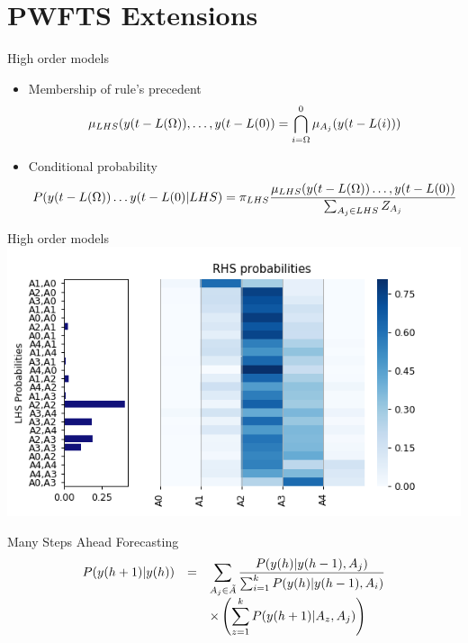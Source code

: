 \documentclass{beamer}
\begin{document}
\section{PWFTS Extensions}


\begin{frame}{High order models}
\begin{itemize}
    \item Membership of rule's precedent
$$
\displaystyle  \mu_{LHS}(y(t-L(\Omega)),\ldots,y(t-L(0)) = \bigcap_{i = \Omega}^0 \mu_{A_j}(y(t-L(i)))
$$
    \item Conditional probability
$$
P(y(t-L(\Omega))\ldots y(t-L(0) | LHS) = \pi_{LHS} \frac{\mu_{LHS}(y(t-L(\Omega))\ldots,y(t-L(0))}{\sum_{A_j \in LHS} Z_{A_j}}
$$
\end{itemize}
\end{frame}


\begin{frame}{High order models}
\includegraphics[width=\textwidth]{figures/pwfts_densities_secondorder.png}
\end{frame}


\begin{frame}{Many Steps Ahead Forecasting}
$$
\begin{array}{rcl}
P(y(h+1) | y(h))     & = &  \displaystyle \sum_{A_j \in \tilde{A}} \frac{ P(y(h)| y(h-1), A_j)}{ \sum_{i = 1}^k P(y(h)| y(h-1), A_i)}  \\
     & & \displaystyle \times  \left(  \sum_{z = 1}^k  P(y(h+1) | A_z,A_j) \right) 
\end{array}
$$
\end{frame}
\end{document}
